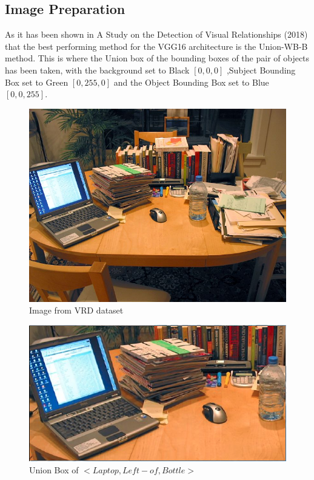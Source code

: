 \documentclass{csfyp}
\begin{document}
\subsection{Image Preparation}
As it has been shown in A Study on the Detection of Visual Relationships (2018) that the best performing method for the VGG16 architecture is the Union-WB-B method. This is where the Union box of the bounding boxes of the pair of objects has been taken, with the background set to Black $[0,0,0]$ ,Subject Bounding Box set to Green $[0,255,0]$ and the Object Bounding Box set to Blue $[0,0,255]$.

\begin{figure}[!htbp]
\centering
\includegraphics[scale=0.25]{originalImage.pdf}
\caption{Image from VRD dataset}
\end{figure}

\begin{figure}[!htbp]
\centering
\includegraphics[scale=0.35]{UnionBox.pdf}
\caption{Union Box of $<Laptop, Left-of , Bottle>$}
\end{figure}
\end{document}
